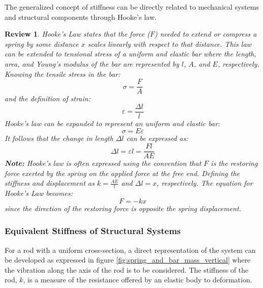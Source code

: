 \documentclass[12pt,letter]{article}
\numberwithin{ex}{section} %
\newtheorem{re}{Review}
\numberwithin{re}{section} %
\newenvironment{review}{\begin{mdframed}[middlelinewidth=2mm,roundcorner=20pt]\begin{re}\normalfont}{\end{re}\end{mdframed}}
\numberwithin{vcs}{section} %
\begin{document}
		The generalized concept of stiffness can be directly related to mechanical systems and structural components through Hooke's law. 
		\begin{review}
			Hooke's Law states that the force ($F$) needed to extend or compress a spring by some distance $x$ scales linearly with respect to that distance. This law can be extended to tensional stress of a uniform and elastic bar where the length, area, and Young's modulus of the bar are represented by $l$, $A$, and $E$, respectively. Knowing the tensile stress in the bar:
			\begin{equation}
			\sigma = \frac{F}{A}
			\end{equation} 			
			and the definition of strain:
			\begin{equation}
			\varepsilon = \frac{\Delta l}{l}
			\end{equation} 			
			Hooke's law can be expanded to represent an uniform and elastic bar:
			\begin{equation}
			\sigma = E \varepsilon
			\end{equation} 			
			It follows that the change in length $\Delta l$ can be expressed as:		
			\begin{equation}
			\Delta l = \varepsilon l = \frac{F l}{A E}
			\end{equation} 
			\textbf{Note:} Hooke's law is often expressed using the convention that $F$ is the restoring force exerted by the spring on the applied force at the free end. Defining the stiffness and displacement as $k = \frac{AE}{l}$ and $\Delta l = x$, respectively. The equation for Hooke's Law becomes:
			\begin{equation}
			F = -kx
			\end{equation} 			
			since the direction of the restoring force is opposite the spring displacement.
		\end{review}
	
		\subsubsection{Equivalent Stiffness of Structural Systems}	
		
            For a rod with a uniform cross-section, a direct representation of the system can be developed as expressed in figure \ref{fig:spring_and_bar_mass_vertical} where the vibration along the axis of the rod is to be considered. The stiffness of the rod, $k$, is a measure of the resistance offered by an elastic body to deformation. 
\end{document}
